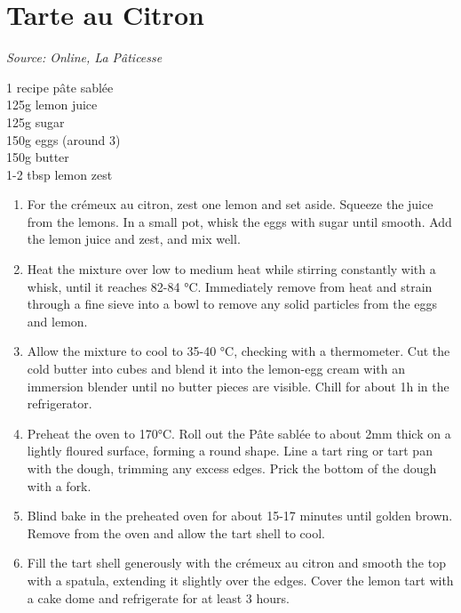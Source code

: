 \documentclass{report}
\begin{document}
\section{Tarte au Citron}
\textit{Source: Online, La Pâticesse}\\
\begin{minipage}[t]{0.21\textwidth} \vspace{0pt} 
1 recipe pâte sablée\\
125g lemon juice\\
125g sugar\\
150g eggs (around 3)\\
150g butter\\
1-2 tbsp lemon zest\\
\end{minipage}
\hfill
\begin{minipage}[t]{0.78\textwidth} \vspace{0pt}
	\begin{enumerate}
		\item For the crémeux au citron, zest one lemon and set aside. Squeeze the juice from the lemons. In a small pot, whisk the eggs with sugar until smooth. Add the lemon juice and zest, and mix well.
		\item Heat the mixture over low to medium heat while stirring constantly with a whisk, until it reaches 82-84 °C. Immediately remove from heat and strain through a fine sieve into a bowl to remove any solid particles from the eggs and lemon.
		\item Allow the mixture to cool to 35-40 °C, checking with a thermometer. Cut the cold butter into cubes and blend it into the lemon-egg cream with an immersion blender until no butter pieces are visible. Chill for about 1h in the refrigerator.
		\item Preheat the oven to 170°C. Roll out the Pâte sablée to about 2mm thick on a lightly floured surface, forming a round shape. Line a tart ring or tart pan with the dough, trimming any excess edges. Prick the bottom of the dough with a fork.
		\item Blind bake in the preheated oven for about 15-17 minutes until golden brown. Remove from the oven and allow the tart shell to cool.
		\item Fill the tart shell generously with the crémeux au citron and smooth the top with a spatula, extending it slightly over the edges. Cover the lemon tart with a cake dome and refrigerate for at least 3 hours.
		\end{enumerate}
	\end{minipage}
\end{document}
